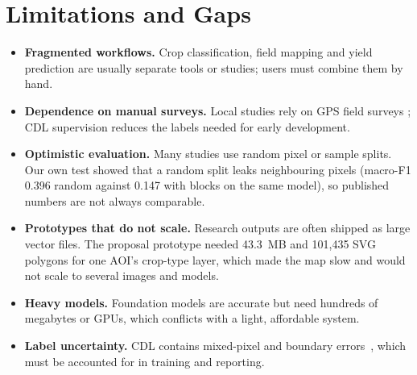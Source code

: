 \section{Limitations and Gaps}
\begin{itemize}
  \item \textbf{Fragmented workflows.} Crop classification, field mapping and yield prediction are
        usually separate tools or studies; users must combine them by hand.
  \item \textbf{Dependence on manual surveys.} Local studies rely on GPS field surveys
        \cite{khan2023}; CDL supervision reduces the labels needed for early development.
  \item \textbf{Optimistic evaluation.} Many studies use random pixel or sample splits. Our own test
        showed that a random split leaks neighbouring pixels (macro-F1 0.396 random against 0.147
        with blocks on the same model), so published numbers are not always comparable.
  \item \textbf{Prototypes that do not scale.} Research outputs are often shipped as large vector
        files. The proposal prototype needed 43.3~MB and 101,435 SVG polygons for one AOI's crop-type
        layer, which made the map slow and would not scale to several images and models.
  \item \textbf{Heavy models.} Foundation models are accurate but need hundreds of megabytes or GPUs,
        which conflicts with a light, affordable system.
  \item \textbf{Label uncertainty.} CDL contains mixed-pixel and boundary errors~\cite{lin2022}, which
        must be accounted for in training and reporting.
\end{itemize}

